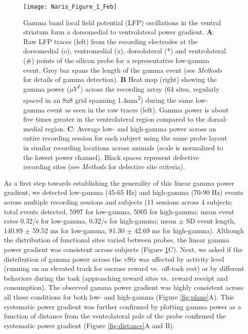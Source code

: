 \documentclass[11pt]{article}
\newcommand{\bsf}[1]{\textbf{#1}}
\begin{document}
\begin{figure}[h]
\centering
\texttt{[image: Naris\_Figure\_1\_Feb]}
\caption{Gamma band local field potential (LFP) oscillations in the
  ventral striatum form a dorsomedial to ventrolateral power gradient.
  \bsf{A}: Raw LFP traces (left) from the recording electrodes at the
  dorsomedial (o), ventromedial (x), dorsolateral (*) and
  ventrolateral (\#) points of the silicon probe for a representative
  low-gamma event.  Grey bar spans the length of the gamma event (see
  {\it Methods} for details of gamma detection). \bsf{B} Heat map
  (right) showing the gamma power ($\mu V^2$) across the recording
  array (64 sites, regularly spaced in an 8x8 grid spanning
  1.4mm\textsuperscript{2}) during the same low-gamma event as seen in
  the raw traces (left). Gamma power is about five times greater in
  the ventrolateral region compared to the dorsal-medial
  region. \bsf{C}: Average low- and high-gamma power across an entire
  recording session for each subject using the same probe layout in
  similar recording locations across animals (scale is normalized to
  the lowest power channel). Black spaces represent defective
  recording sites (see {\it Methods} for defective site criteria).}
\label{fig:distrib}
\end{figure}

As a first step towards establishing the generality of this linear
gamma power gradient, we detected low-gamma (45-65 Hz) and high-gamma
(70-90 Hz) events across multiple recording sessions and subjects (11
sessions across 4 subjects; total events detected, 5997 for low-gamma,
5005 for high-gamma; mean event rates 0.32/s for low-gamma, 0.32/s for
high-gamma; mean $\pm$ SD event length, 140.89 $\pm$ 59.52 ms for
low-gamma, 81.30 $\pm$ 42.69 ms for high-gamma). Although the
distribution of functional sites varied between probes, the linear
gamma power gradient was consistent across subjects (Figure
\ref{fig:distrib}C).  Next, we asked if the distribution of gamma
power across the vStr was affected by activity level (running on an
elevated track for sucrose reward vs.\ off-task rest) or by different
behaviors during the task (approaching reward sites vs.\ reward
receipt and consumption). The observed gamma power gradient was highly
consistent across all these conditions for both low- and high-gamma
(Figure \ref{fig:plane}A). This systematic power gradient was further
confirmed by plotting gamma power as a function of distance from the
ventrolateral pole of the probe confirmed the systematic power
gradient (Figure \ref{fig:distance}A and B).
\end{document}
